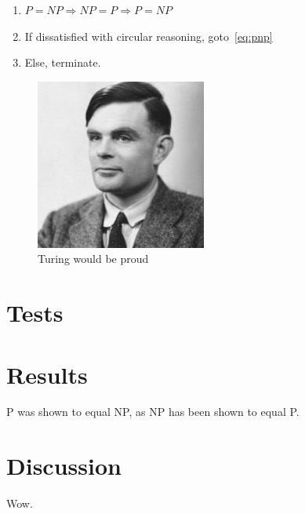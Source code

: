 \documentclass[a4paper]{article}
\begin{document}
\begin{enumerate}
\item \label{eq:pnp}$P=NP \Rightarrow NP=P \Rightarrow P=NP $
\item If dissatisfied with circular reasoning, goto~\ref{eq:pnp}
\item Else, terminate.
\end{enumerate}

\begin{figure}[h!]
  \centering
  \includegraphics[width=0.5\textwidth]{img/turing-portrait.jpg}
  \caption{Turing would be proud}
  \label{fig:turing}
\end{figure}

\section{Tests} %

\section{Results} %

P was shown to equal NP, as NP has been shown to equal P.

\section{Discussion} %

Wow.

\printbibliography
\end{document}
